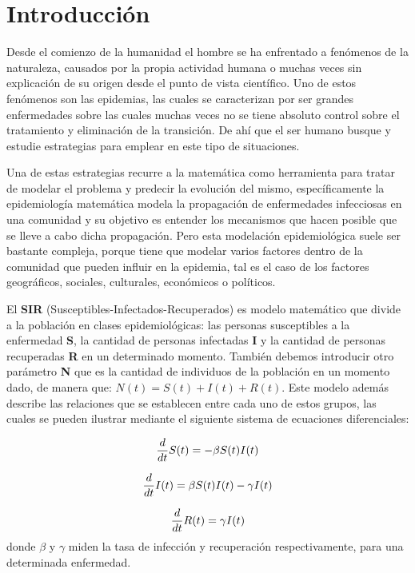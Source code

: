 \documentclass{article}
\begin{document}
    \section{Introducción}
    
    Desde el comienzo de la humanidad el hombre se ha enfrentado a fenómenos de la naturaleza, causados por la propia actividad humana o muchas veces sin explicación de su origen desde el punto de vista científico. Uno de estos fenómenos son las epidemias, las cuales se caracterizan por ser grandes enfermedades sobre las cuales muchas veces no se tiene absoluto control sobre el tratamiento y eliminación de la transición. De ahí que el ser humano busque y estudie estrategias para emplear en este tipo de situaciones.
    
    Una de estas estrategias recurre a la matemática como herramienta para tratar de modelar el problema y predecir la evolución del mismo, específicamente la epidemiología matemática modela la propagación de enfermedades infecciosas en una comunidad y su objetivo es entender los mecanismos que hacen posible que se lleve a cabo dicha propagación. Pero esta modelación epidemiológica suele ser bastante compleja, porque tiene que modelar varios factores dentro de la comunidad que pueden influir en la epidemia, tal es el caso de los factores geográficos, sociales, culturales, económicos o políticos.
    
    El \textbf{SIR} (Susceptibles-Infectados-Recuperados) es modelo matemático que divide a la población en clases epidemiológicas: las personas susceptibles a la enfermedad \textbf{S}, la cantidad de personas infectadas \textbf{I} y la cantidad de personas recuperadas \textbf{R} en un determinado momento. También debemos introducir otro parámetro \textbf{N} que es la cantidad de individuos de la población en un momento dado, de manera que: $N(t)=S(t)+I(t)+R(t)$. Este modelo además describe las relaciones que se establecen entre cada uno de estos grupos, las cuales se pueden ilustrar mediante el siguiente sistema de ecuaciones diferenciales:
       
    \begin{equation}
    		{d\over dt}S(t)=-\beta S(t)I(t)
    \end{equation}
    
    \begin{equation}
    		{d\over dt}I(t)=\beta S(t)I(t)-\gamma I(t)
    \end{equation}
    
    \begin{equation}
   		{d\over dt}R(t)=\gamma I(t) 
    \end{equation}
donde $\beta$ y $\gamma$ miden la tasa de infección y recuperación respectivamente, para una determinada enfermedad. 
\end{document}

